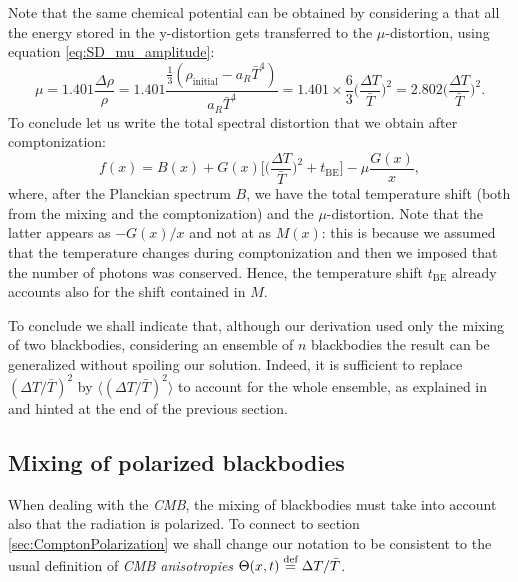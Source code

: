 Note that the same chemical potential can be obtained by considering a that all the energy stored in the y-distortion gets transferred to the $\mu$-distortion, using equation \ref{eq:SD_mu_amplitude}:$$\mu=1.401\frac{\Delta \rho}{\rho}=1.401\frac{\frac{1}{3}(\rho_\text{initial}-a_R \bar T^4)}{a_R \bar T^4}=1.401\times\frac{6}{3}\bigg(\frac{\Delta T}{\bar T}\bigg)^2=2.802\bigg(\frac{\Delta T}{\bar T}\bigg)^2.$$
To conclude let us write the total spectral distortion that we obtain after comptonization:
$$f(x)=B(x)+G(x)\bigg[\bigg(\frac{\Delta T}{\bar T}\bigg)^2+t_\text{BE}\bigg]-\mu\frac{G(x)}{x},$$
where, after the Planckian spectrum $B$, we have the total temperature shift (both from the mixing and the comptonization) and the $\mu$-distortion. Note that the latter appears as $-G(x)/x$ and not at as $M(x)$: this is because we assumed that the temperature changes during comptonization and then we imposed that the number of photons was conserved. Hence, the temperature shift $t_\text{BE}$ already accounts also for the shift contained in $M$.

To conclude we shall indicate that, although our derivation used only the mixing of two blackbodies, considering an ensemble of $n$ blackbodies the result can be generalized without spoiling our solution. Indeed, it is sufficient to replace $(\Delta T/\bar T)^2$ by $\langle(\Delta T/\bar T)^2\rangle$ to account for the whole ensemble, as explained in \cite{MixingBB} and hinted at the end of the previous section.

\subsection{Mixing of polarized blackbodies}
\label{sec:MixingPolarization}
When dealing with the \emph{CMB}, the mixing of blackbodies must take into account also that the radiation is polarized. To connect to section \ref{sec:ComptonPolarization} we shall change our notation to be consistent to the usual definition of \emph{CMB anisotropies} $\Theta(x,t)\stackrel{\text{def}}{=} \Delta T/\bar T$.

